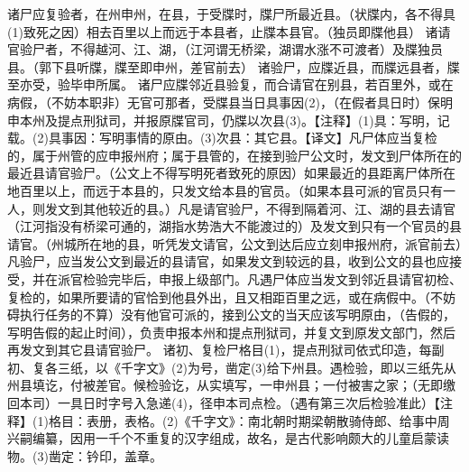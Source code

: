 \documentclass[12pt,UTF8]{ctexbook}
\begin{document}
诸尸应复验者，在州申州，在县，于受牒时，牒尸所最近县。（状牒内，各不得具(1)致死之因）相去百里以上而远于本县者，止牒本县官。（独员即牒他县）
诸请官验尸者，不得越河、江、湖，（江河谓无桥梁，湖谓水涨不可渡者）及牒独员县。（郭下县听牒，牒至即申州，差官前去）
诸验尸，应牒近县，而牒远县者，牒至亦受，验毕申所属。
诸尸应牒邻近县验复，而合请官在别县，若百里外，或在病假，（不妨本职非）无官可那者，受牒县当日具事因(2)，（在假者具日时）保明申本州及提点刑狱司，并报原牒官司，仍牒以次县(3)。【注释】(1)具：写明，记载。(2)具事因：写明事情的原由。(3)次县：其它县。【译文】凡尸体应当复检的，属于州管的应申报州府；属于县管的，在接到验尸公文时，发文到尸体所在的最近县请官验尸。（公文上不得写明死者致死的原因）如果最近的县距离尸体所在地百里以上，而远于本县的，只发文给本县的官员。（如果本县可派的官员只有一人，则发文到其他较近的县。）凡是请官验尸，不得到隔着河、江、湖的县去请官（江河指没有桥梁可通的，湖指水势浩大不能渡过的）及发文到只有一个官员的县请官。（州城所在地的县，听凭发文请官，公文到达后应立刻申报州府，派官前去）凡验尸，应当发公文到最近的县请官，如果发文到较远的县，收到公文的县也应接受，并在派官检验完毕后，申报上级部门。凡遇尸体应当发文到邻近县请官初检、复检的，如果所要请的官恰到他县外出，且又相距百里之远，或在病假中。（不妨碍执行任务的不算）没有他官可派的，接到公文的当天应该写明原由，（告假的，写明告假的起止时间），负责申报本州和提点刑狱司，并复文到原发文部门，然后再发文到其它县请官验尸。
诸初、复检尸格目(1)，提点刑狱司依式印造，每副初、复各三纸，以《千字文》(2)为号，凿定(3)给下州县。遇检验，即以三纸先从州县填讫，付被差官。候检验讫，从实填写，一申州县；一付被害之家；（无即缴回本司）一具日时字号入急递(4)，径申本司点检。（遇有第三次后检验准此）【注释】(1)格目：表册，表格。(2)《千字文》：南北朝时期梁朝散骑侍郎、给事中周兴嗣编纂，因用一千个不重复的汉字组成，故名，是古代影响颇大的儿童启蒙读物。(3)凿定：钤印，盖章。
\end{document}
